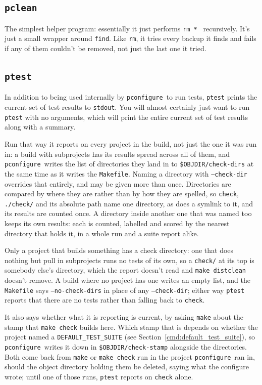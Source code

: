 \documentclass{article}
\newcommand{\pconfigure}{\texttt{pconfigure}}
\begin{document}
\subsection{\texttt{pclean} \label{prog:pclean}}

The simplest helper program: essentially it just performs \texttt{rm
  *~} recursively.  It's just a small wrapper around \texttt{find}.
Like \texttt{rm}, it tries every backup it finds and fails if any of
them couldn't be removed, not just the last one it tried.

\subsection{\texttt{ptest} \label{prog:ptest}}

In addition to being used internally by \pconfigure\ to run tests,
\texttt{ptest} prints the current set of test results to
\texttt{stdout}.  You will almost certainly just want to run
\texttt{ptest} with no arguments, which will print the entire current
set of test results along with a summary.

Run that way it reports on every project in the build, not just the
one it was run in: a build with subprojects has its results spread
across all of them, and \pconfigure\ writes the list of directories
they land in to \texttt{\$OBJDIR/check-dirs} at the same time as it
writes the \texttt{Makefile}.  Naming a directory with
\texttt{--check-dir} overrides that entirely, and may be given more
than once.  Directories are compared by where they are rather than by
how they are spelled, so \texttt{check}, \texttt{./check/} and its
absolute path name one directory, as does a symlink to it, and its
results are counted once.
A directory inside another one that was named too keeps its own
results: each is counted, labelled and scored by the nearest
directory that holds it, in a whole run and a suite report alike.

Only a project that builds something has a check directory: one that
does nothing but pull in subprojects runs no tests of its own, so a
\texttt{check/} at its top is somebody else's directory, which the
report doesn't read and \texttt{make distclean} doesn't remove.  A
build where no project has one writes an empty list, and the
\texttt{Makefile} says \texttt{--no-check-dirs} in place of any
\texttt{--check-dir}; either way \texttt{ptest} reports that there
are no tests rather than falling back to \texttt{check}.

It also says whether what it is reporting is current, by asking
\texttt{make} about the stamp that \texttt{make check} builds here.
Which stamp that is depends on whether the project named a
\texttt{DEFAULT\_TEST\_SUITE} (see
Section~\ref{cmd:default_test_suite}), so \pconfigure\ writes it
down in \texttt{\$OBJDIR/check-stamp} alongside the directories.
Both come back from \texttt{make} or \texttt{make check} run in the
project \pconfigure\ ran in, should the object directory holding them
be deleted, saying what the configure wrote; until one of those runs,
\texttt{ptest} reports on \texttt{check} alone.
\end{document}
